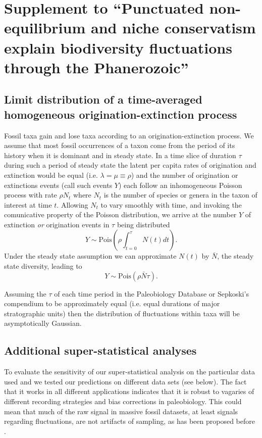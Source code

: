 \chapter{Supplement to ``Punctuated non-equilibrium and niche conservatism explain
  biodiversity fluctuations through the Phanerozoic''}

\section{Limit distribution of a time-averaged homogeneous
  origination-extinction process}
\label{sec:suppLimitDist}
Fossil taxa gain and lose taxa according to an origination-extinction
process. We assume that most fossil occurrences of a taxon come from
the period of its history when it is dominant and in steady state. In
a time slice of duration $\tau$ during such a period of steady state
the latent per capita rates of origination and extinction would be
equal (i.e. $\lambda = \mu \equiv \rho$) and the number of origination
or extinctions events (call such events $Y$) each follow an
inhomogeneous Poisson process with rate $\rho N_t$ where $N_t$ is the
number of species or genera in the taxon of interest at time
$t$. Allowing $N_t$ to vary smoothly with time, and invoking the
comunicative property of the Poisson distribution, we arrive at the
number $Y$ of extinction \emph{or} origination events in $\tau$ being
distributed
\begin{equation}
  \label{eq:eventPois1}
  Y \sim \text{Pois}(\rho \int_{t=0}^\tau N(t) dt).
\end{equation}
Under the steady state assumption we can approximate $N(t)$ by
$\bar{N}$, the steady state diversity, leading to
\begin{equation}
  \label{eq:eventPois2}
  Y \sim \text{Pois}(\rho \bar{N} \tau).
\end{equation}

Assuming the $\tau$ of each time period in the Paleobiology Database
or Sepkoski's compendium to be approximately equal (i.e. equal
durations of major stratographic units) then the distribution of
fluctuations within taxa will be asymptotically Gaussian.

\section{Additional super-statistical analyses}
To evaluate the sensitivity of our super-statistical analysis on the
particular data used and we tested our predictions on different data
sets (see below). The fact that it works in all different applications
indicates that it is robust to vagaries of different recording
strategies and bias corrections in paleobiology. This could mean that
much of the raw signal in massive fossil datasets, at least signals
regarding fluctuations, are not artifacts of sampling, as has been
proposed before \cite{hannisdal2011}.

